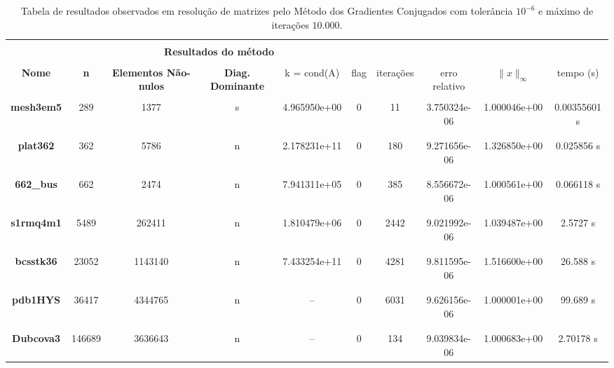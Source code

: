 
\begin{table}[ht]
    \centering
    \begin{tabular}{|c|c|c|c|c|c|c|c|c|c|}
        \hline \rowcolor{Gray}
        \multicolumn{10}{|c|}{\bfseries Tabela do Método dos Gradientes Conjugados com tolerância $10^{-6}$ e máximo de iterações $10.000$ }\\
        \hline \rowcolor{Gray}  \multicolumn{5}{|c|}{} & \multicolumn{5}{|c|}{} \\
         [-1em]  \rowcolor{Gray}
         \multicolumn{5}{|c|}{\bfseries Informações da matriz } & \multicolumn{5}{|c|}{\bfseries Resultados do método }\\
         \hline \rowcolor{Gray} & & & & & & & & & \\
         [-1em]
         \rowcolor{Gray}
         \bfseries Nome & \bfseries n & \bfseries Elementos Não-nulos & \bfseries Diag. Dominante &
         k = cond(A) & flag & iterações &
         erro relativo &
         $\|x\|_\infty$  & tempo (s) \\
         \hline & & & & & & & & & \\
         [-1em] \bfseries mesh3em5 & 289 & 1377 & s & 4.965950e+00 & 0 & 11 & 3.750324e-06 & 1.000046e+00 & 0.00355601 s \\ & & & & & & & & & \\ [-1em] \hline \\
         [-1em] \bfseries plat362 & 362 & 5786 & n &  2.178231e+11 & 0 & 180 & 9.271656e-06 & 1.326850e+00 & 0.025856 s \\ & & & & & & & & & \\ [-1em] \hline \\
         [-1em] \bfseries 662\_bus & 662 & 2474 & n &  7.941311e+05 & 0 & 385 & 8.556672e-06 & 1.000561e+00 & 0.066118 s \\ & & & & & & & & & \\ [-1em] \hline \\
         [-1em] \bfseries s1rmq4m1 & 5489 & 262411 & n & 1.810479e+06 & 0 & 2442 & 9.021992e-06 & 1.039487e+00 & 2.5727 s \\ & & & & & & & & & \\ [-1em] \hline \\
         [-1em] \bfseries bcsstk36 & 23052 & 1143140 & n & 7.433254e+11 & 0 & 4281 & 9.811595e-06 & 1.516600e+00 & 26.588 s \\ & & & & & & & & & \\ [-1em] \hline \\
         [-1em] \bfseries pdb1HYS & 36417 & 4344765 & n & -- & 0 & 6031 & 9.626156e-06 & 1.000001e+00 & 99.689 s \\ & & & & & & & & & \\ [-1em] \hline \\
         [-1em] \bfseries Dubcova3 & 146689 & 3636643 & n & -- & 0 & 134 & 9.039834e-06 & 1.000683e+00 & 2.70178 s \\ \hline
    \end{tabular}
    \caption{Tabela de resultados observados em resolução de matrizes pelo Método dos Gradientes Conjugados com tolerância $10^{-6}$ e máximo de iterações $10.000$.}
    \label{tab:resultados-10k-6}
\end{table}